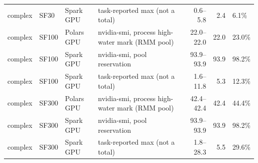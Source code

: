 \begin{tabular}{llllrrl}
complex & SF30 & Spark GPU & task-reported max (not a total) & 0.6--5.8 & 2.4 & 6.1\% \\
complex & SF100 & Polars GPU & nvidia-smi, process high-water mark (RMM pool) & 22.0--22.0 & 22.0 & 23.0\% \\
complex & SF100 & Spark GPU & nvidia-smi, pool reservation & 93.9--93.9 & 93.9 & 98.2\% \\
complex & SF100 & Spark GPU & task-reported max (not a total) & 1.6--11.8 & 5.3 & 12.3\% \\
complex & SF300 & Polars GPU & nvidia-smi, process high-water mark (RMM pool) & 42.4--42.4 & 42.4 & 44.4\% \\
complex & SF300 & Spark GPU & nvidia-smi, pool reservation & 93.9--93.9 & 93.9 & 98.2\% \\
complex & SF300 & Spark GPU & task-reported max (not a total) & 1.8--28.3 & 5.5 & 29.6\% \\
\bottomrule
\end{tabular}
